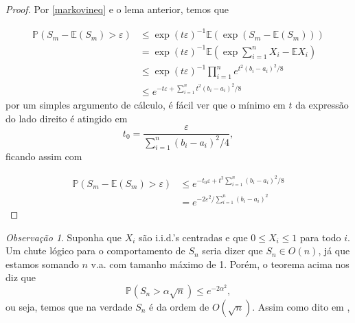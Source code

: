 \documentclass[12pt,a4paper,oneside]{book}
\theoremstyle{definition}
\theoremstyle{remark}
\newtheorem{remark}[theorem]{Observa\c{c}\~ao}
\numberwithin{equation}{section}
\newcommand{\e}{\varepsilon}
\newcommand{\E}{\mathbb{E}}
\newcommand{\pr}{\mathbb{P}}
\begin{document}
\begin{proof}
Por \ref{markovineq} e o lema anterior, temos que 

\begin{align*}
\pr(S_m -\E(S_m)>\e) &\leq \exp(t\e)^{-1}\E(\exp(S_m -\E(S_m)))\\
&= \exp(t\e)^{-1}\E( \exp{\sum_{i=1}^n X_i - \E X_i  }  )\\
&\leq \exp(t\e)^{-1}\prod_{i=1}^n e^{t^2(b_i-a_i)^2/8}\\
&\leq e^{-t\e + \sum_{i=1}^nt^2(b_i-a_i)^2/8}
\end{align*}
por um simples argumento de cálculo, é fácil ver que o mínimo em $t$ da expressão do lado direito é atingido em 
$$t_0 = \dfrac{\e}{\sum_{i=1}^n(b_i-a_i)^2/4}, $$
ficando assim com


\begin{align*}
\pr(S_m -\E(S_m)>\e) &\leq e^{-t_0\e + t^2\sum_{i=1}^n(b_i-a_i)^2/8}\\
            &=e^{-2\e^2/\sum_{i=1}^n(b_i-a_i)^2}
\end{align*}

\end{proof}

\begin{tcolorbox}[colback = yellow!60]
\begin{remark}

Suponha que $X_i$ são i.i.d.'s centradas e que $0\leq X_i\leq 1$ para todo $i.$ Um chute lógico para o comportamento de $S_n$ seria dizer que $S_n\in O(n)$, já que estamos somando $n$ v.a. com tamanho máximo de 1.
Porém, o teorema acima nos diz que
$$\pr(S_n >\alpha\sqrt{n}) \leq e^{-2\alpha^2}, $$
ou seja, temos que na verdade $S_n$ é da ordem de $O(\sqrt{n}).$ Assim como dito em  \cite{taomatrix}, 


\end{remark}
\end{tcolorbox}
\end{document}
